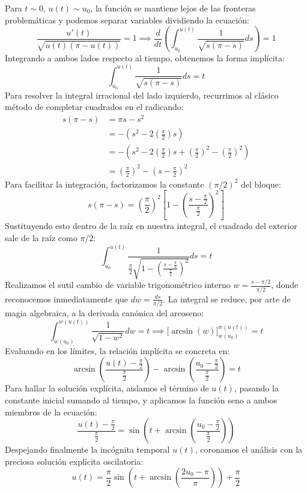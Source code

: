 {    Para $t \sim 0$, $u(t) \sim u_0$, la función se mantiene lejos de las fronteras problemáticas y podemos separar variables dividiendo la ecuación:
    \[  
        \frac{u'(t)}{\sqrt{u(t)(\pi - u(t))}} = 1 \implies \frac{d}{dt} \left( \int_{u_0}^{u(t)} \frac{1}{\sqrt{s(\pi - s)}} ds \right) = 1
    \]
    Integrando a ambos lados respecto al tiempo, obtenemos la forma implícita:
    \[
        \int_{u_0}^{u(t)} \frac{1}{\sqrt{s(\pi - s)}} ds = t
    \]
    Para resolver la integral irracional del lado izquierdo, recurrimos al clásico método de completar cuadrados en el radicando:
    \begin{align*}
        s(\pi - s) &= \pi s - s^2 \\
        &= - \left( s^2 - 2 \left(\frac{\pi}{2}\right) s \right) \\
        &= - \left( s^2 - 2 \left(\frac{\pi}{2}\right) s + \left(\frac{\pi}{2}\right)^2 - \left(\frac{\pi}{2}\right)^2 \right) \\
        &= \left(\frac{\pi}{2} \right)^2 - \left(s - \frac{\pi}{2} \right)^2 
    \end{align*}
    Para facilitar la integración, factorizamos la constante $(\pi/2)^2$ del bloque:
    \[
        s(\pi - s) = \left(\frac{\pi}{2} \right)^2 \left[ 1 - \left(\frac{s - \frac{\pi}{2}}{\frac{\pi}{2}} \right)^2 \right] 
    \]
    Sustituyendo esto dentro de la raíz en nuestra integral, el cuadrado del exterior sale de la raíz como $\pi/2$:
    \[
        \int_{u_0}^{u(t)} \frac{1}{\frac{\pi}{2} \sqrt{1 - \left(\frac{s - \frac{\pi}{2}}{\frac{\pi}{2}} \right)^2}} ds = t
    \]
    Realizamos el sutil cambio de variable trigonométrico interno $w = \frac{s - \pi/2}{\pi/2}$, donde reconocemos inmediatamente que $dw = \frac{ds}{\pi/2}$. La integral se reduce, por arte de magia algebraica, a la derivada canónica del arcoseno:
    \[
        \int_{w(u_0)}^{w(u(t))} \frac{1}{\sqrt{1 - w^2}} dw = t \implies \Big[ \arcsin(w) \Big]_{w(u_0)}^{w(u(t))} = t
    \]
    Evaluando en los límites, la relación implícita se concreta en:
    \[
        \arcsin \left( \frac{u(t) - \frac{\pi}{2}}{\frac{\pi}{2}} \right) - \arcsin \left( \frac{u_0 - \frac{\pi}{2}}{\frac{\pi}{2}} \right) = t
    \]
    Para hallar la solución explícita, aislamos el término de $u(t)$, pasando la constante inicial sumando al tiempo, y aplicamos la función seno a ambos miembros de la ecuación:
    \[
        \frac{u(t) - \frac{\pi}{2}}{\frac{\pi}{2}} = \sin\left( t + \arcsin \left( \frac{u_0 - \frac{\pi}{2}}{\frac{\pi}{2}} \right) \right)
    \]
    Despejando finalmente la incógnita temporal $u(t)$, coronamos el análisis con la preciosa solución explícita oscilatoria:
    \[
        \boxed{u(t) = \frac{\pi}{2} \sin\left( t + \arcsin \left( \frac{2u_0 - \pi}{\pi} \right) \right) + \frac{\pi}{2}}
    \]
}

